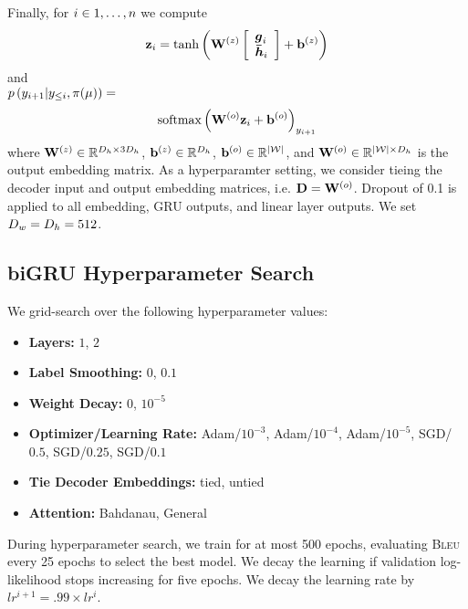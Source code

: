 Finally, for $i \in 1, \ldots, n$ we compute
\begin{align*}
\mathbf{z}_i =  \tanh\left(\mathbf{W}^{(z)}\left[\begin{array}{l} 
    \boldsymbol{g}_i\\ \boldsymbol{\bar{h}}_i \end{array}\right] + \mathbf{b}^{(z)}\right) \\
\end{align*} and \\

\noindent $p\left(y_{i+1}|y_{\le i}, \pi(\mu)\right)  =$
\begin{align*}
    \operatorname{softmax}\left(\mathbf{W}^{(o)}\mathbf{z}_i + \mathbf{b}^{(o)}\right)_{y_{i+1}}  
\end{align*}
where $\mathbf{W}^{(z)} \in \mathbb{R}^{{D_h} \times 3{D_h}}$, $\mathbf{b}^{(z)} \in\mathbb{R}^{{D_h}}$, 
$\mathbf{b}^{(o)} \in \mathbb{R}^{{\lvert \mathcal{W} \rvert}}$,
and $\mathbf{W}^{(o)} \in \mathbb{R}^{{\lvert \mathcal{W} \rvert} \times {D_h}}$ is the output
    embedding matrix. 
    As a hyperparamter setting, we consider tieing the decoder 
    input and output
    embedding matrices, i.e. $\mathbf{D} = \mathbf{W}^{(o)}$.
    Dropout of 0.1 is applied to all embedding, GRU outputs, and linear
    layer outputs. We set ${D_w} = {D_h} = 512$.


\subsection{biGRU Hyperparameter Search}

We grid-search over the following hyperparameter values:

\begin{itemize}
    \item \textbf{Layers:}  $1$, $2$ 
    \item \textbf{Label Smoothing:} $0$, $0.1$
    \item \textbf{Weight Decay:} $0$, $10^{-5}$
    \item \textbf{Optimizer/Learning Rate:} Adam/$10^{-3}$, Adam/$10^{-4}$, Adam/$10^{-5}$,
        SGD/$0.5$, SGD/$0.25$, SGD/$0.1$
    \item \textbf{Tie Decoder Embeddings:} tied, untied
     \item \textbf{Attention:} Bahdanau, General
       \end{itemize}

During hyperparameter search, we train for at most 500
epochs, evaluating \textsc{Bleu} every 25 epochs to select the best model.
We decay the learning if validation log-likelihood stops increasing 
for five epochs. We decay the learning rate by $lr^{i+1}= .99 \times lr^{i}$.


